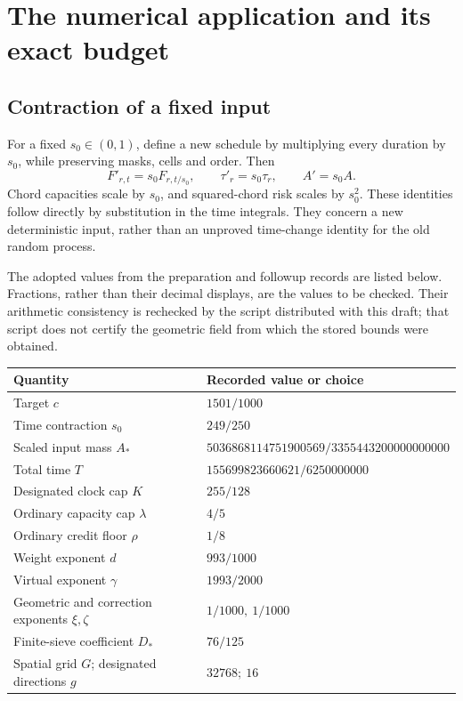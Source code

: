 \section{The numerical application and its exact budget}\label{sec:numerics}

\subsection{Contraction of a fixed input}
For a fixed \(s_0\in(0,1)\), define a new schedule by multiplying
every duration by \(s_0\), while preserving masks, cells and order.
Then
\[
 F'_{r,t}=s_0F_{r,t/s_0},\qquad \tau'_r=s_0\tau_r,
 \qquad A'=s_0A.
\]
Chord capacities scale by \(s_0\), and squared-chord risk scales by
\(s_0^2\). These identities follow directly by substitution in the
time integrals. They concern a new deterministic input, rather than
an unproved time-change identity for the old random process.

The adopted values from the preparation and followup records are
listed below. Fractions, rather than their decimal displays, are the
values to be checked. Their arithmetic consistency is rechecked by
the script distributed with this draft; that script does not certify
the geometric field from which the stored bounds were obtained.

\begin{center}
\begin{tabular}{@{}ll@{}}
\toprule
Quantity & Recorded value or choice\\
\midrule
Target \(c\) & \(1501/1000\)\\
Time contraction \(s_0\) & \(249/250\)\\
Scaled input mass \(A_*\) & \(5036868114751900569/3355443200000000000\)\\
Total time \(T\) & \(155699823660621/6250000000\)\\
Designated clock cap \(K\) & \(255/128\)\\
Ordinary capacity cap \(\lambda\) & \(4/5\)\\
Ordinary credit floor \(\rho\) & \(1/8\)\\
Weight exponent \(d\) & \(993/1000\)\\
Virtual exponent \(\gamma\) & \(1993/2000\)\\
Geometric and correction exponents \(\xi,\zeta\) & \(1/1000,\ 1/1000\)\\
Finite-sieve coefficient \(D_*\) & \(76/125\)\\
Spatial grid \(G\); designated directions \(g\) & \(32768;\ 16\)\\
\bottomrule
\end{tabular}
\end{center}

